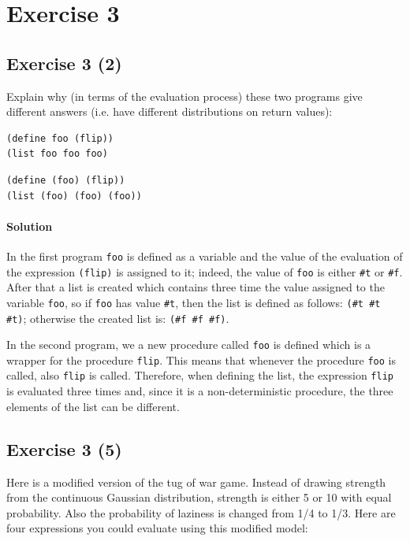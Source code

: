 \section*{Exercise 3}

\subsection*{Exercise 3 (2)}
Explain why (in terms of the evaluation process) these two programs give different answers 
(i.e. have different distributions on return values):
\begin{lstlisting}
(define foo (flip))
(list foo foo foo)
\end{lstlisting}

\begin{lstlisting}
(define (foo) (flip))
(list (foo) (foo) (foo))
\end{lstlisting}    

\paragraph{Solution} 
In the first program \texttt{foo} is defined as a variable and the value of the evaluation of the expression \texttt{(flip)} is
assigned to it; indeed, the value of \texttt{foo} is either \texttt{\#t} or \texttt{\#f}.
After that a list is created which contains three time the value assigned to the variable \texttt{foo}, so if \texttt{foo} has value
\texttt{\#t}, then the list is defined as follows: \texttt{\textquotesingle(\#t \#t \#t)}; otherwise the created list is:
\texttt{\textquotesingle(\#f \#f \#f)}.

In the second program, we a new procedure called \texttt{foo} is defined which is a wrapper for the procedure \texttt{flip}. This means
that whenever the procedure \texttt{foo} is called, also \texttt{flip} is called.
Therefore, when defining the list, the expression \texttt{flip} is evaluated three times and, since it is a non-deterministic 
procedure, the three elements of the list can be different.


\subsection*{Exercise 3 (5)}
Here is a modified version of the tug of war game. Instead of drawing strength from the continuous Gaussian 
distribution, strength is either 5 or 10 with equal probability. Also the probability of laziness is changed from 1/4 to 1/3. 
Here are four expressions you could evaluate using this modified model:

